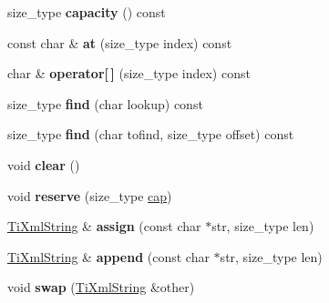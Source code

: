 \begin{DoxyCompactItemize}
\item 
\hypertarget{class_ti_xml_string_a76e4d6aba7845f4cf9c02332a5fbf916}{size\+\_\+type {\bfseries capacity} () const }\label{class_ti_xml_string_a76e4d6aba7845f4cf9c02332a5fbf916}

\item 
\hypertarget{class_ti_xml_string_a6763093267bbdecbf03f8840bc349877}{const char \& {\bfseries at} (size\+\_\+type index) const }\label{class_ti_xml_string_a6763093267bbdecbf03f8840bc349877}

\item 
\hypertarget{class_ti_xml_string_ae8cdc1d46c538536b786f7ae03c0c1d9}{char \& {\bfseries operator\mbox{[}$\,$\mbox{]}} (size\+\_\+type index) const }\label{class_ti_xml_string_ae8cdc1d46c538536b786f7ae03c0c1d9}

\item 
\hypertarget{class_ti_xml_string_a5c2b368b5eafe075fd9565cbcbd4c2f9}{size\+\_\+type {\bfseries find} (char lookup) const }\label{class_ti_xml_string_a5c2b368b5eafe075fd9565cbcbd4c2f9}

\item 
\hypertarget{class_ti_xml_string_a5f2a6fd565751410b392f249a9786db4}{size\+\_\+type {\bfseries find} (char tofind, size\+\_\+type offset) const }\label{class_ti_xml_string_a5f2a6fd565751410b392f249a9786db4}

\item 
\hypertarget{class_ti_xml_string_ab20e06e4c666abf3bdbfb3a1191d4888}{void {\bfseries clear} ()}\label{class_ti_xml_string_ab20e06e4c666abf3bdbfb3a1191d4888}

\item 
\hypertarget{class_ti_xml_string_a88ecf9f0f00cb5c67b6b637958d7049c}{void {\bfseries reserve} (size\+\_\+type \hyperlink{classcap}{cap})}\label{class_ti_xml_string_a88ecf9f0f00cb5c67b6b637958d7049c}

\item 
\hypertarget{class_ti_xml_string_afe4cd3452ccd7cd8c8cac16e24ea28d7}{\hyperlink{class_ti_xml_string}{Ti\+Xml\+String} \& {\bfseries assign} (const char $\ast$str, size\+\_\+type len)}\label{class_ti_xml_string_afe4cd3452ccd7cd8c8cac16e24ea28d7}

\item 
\hypertarget{class_ti_xml_string_a717b00190c8acdee94816d2f4f20e75a}{\hyperlink{class_ti_xml_string}{Ti\+Xml\+String} \& {\bfseries append} (const char $\ast$str, size\+\_\+type len)}\label{class_ti_xml_string_a717b00190c8acdee94816d2f4f20e75a}

\item 
\hypertarget{class_ti_xml_string_aa392cbc180752a79f007f4f9280c7762}{void {\bfseries swap} (\hyperlink{class_ti_xml_string}{Ti\+Xml\+String} \&other)}\label{class_ti_xml_string_aa392cbc180752a79f007f4f9280c7762}

\end{DoxyCompactItemize}
